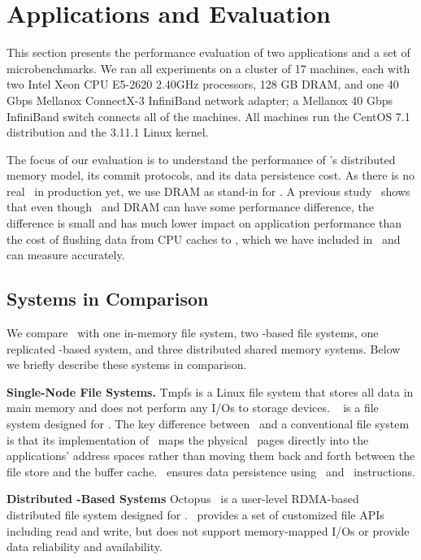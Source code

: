 \section{Applications and Evaluation}
\label{sec:hotpot:app}

This section presents the performance evaluation of two applications and a set of microbenchmarks.
We ran all experiments on a cluster of 17 machines, each with two Intel Xeon CPU E5-2620 2.40GHz
processors, 128 GB DRAM, and one 40 Gbps Mellanox ConnectX-3 InfiniBand network adapter;
a Mellanox 40 Gbps InfiniBand switch connects all of the machines. 
All machines run the CentOS 7.1 distribution and the 3.11.1 Linux kernel.

The focus of our evaluation is to understand the performance of \dsnvm's distributed memory model,
its commit protocols, and its data persistence cost. As there is no real \nvm\ in production yet,
we use DRAM as stand-in for \nvm. A previous study~\cite{Zhang15-NVMMStudy} shows that even though
\nvm\ and DRAM can have some performance difference, the difference is small and has much lower impact
on application performance than the cost of flushing data from CPU caches to \nvm, which we have
included in \hotpot\ and can measure accurately.

\subsection{Systems in Comparison}
\label{sec:hotpot:comparesys}
We compare \hotpot\ with one in-memory file system, two \nvm-based file systems, 
one replicated \nvm-based system, and three distributed shared memory systems.
Below we briefly describe these systems in comparison.

{\textbf{Single-Node File Systems.}} 
Tmpfs is a Linux file system that stores all data in main memory and does not perform any I/Os to storage devices.
\pmfs~\cite{Dulloor14-EuroSys} is a file system designed for \nvm. 
The key difference between \pmfs\ and a conventional file system is that its implementation of
\mmap\ maps the physical \nvm\ pages directly into the applications' address spaces rather than moving them back and
forth between the file store and the buffer cache.
\pmfs\ ensures data persistence using \sfence\ and \clflush\ instructions.

{\textbf{Distributed \nvm-Based Systems}}
Octopus~\cite{Octopus} is a user-level RDMA-based distributed file system designed for \nvm.
\Octopus\ provides a set of customized file APIs including read and write,
but does not support memory-mapped I/Os or provide data reliability and availability.

